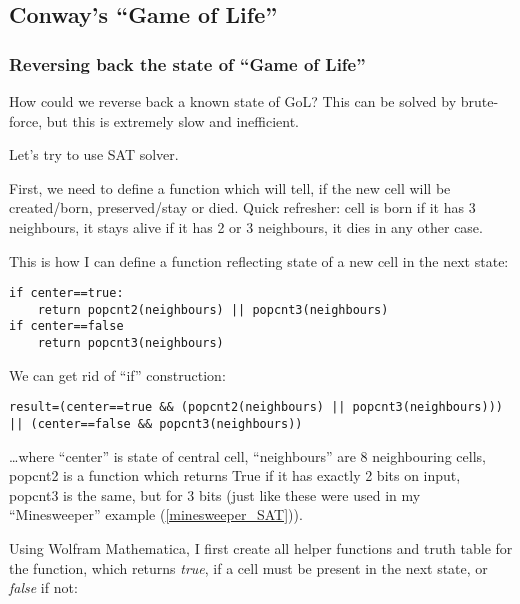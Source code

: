 \subsection{Conway's ``Game of Life''}

\renewcommand{\CURPATH}{CA/GoL}

\subsubsection{Reversing back the state of ``Game of Life''}

How could we reverse back a known state of GoL?
This can be solved by brute-force, but this is extremely slow and inefficient.

Let's try to use SAT solver.

First, we need to define a function which will tell, if the new cell will be created/born, preserved/stay or died.
Quick refresher: cell is born if it has 3 neighbours, it stays alive if it has 2 or 3 neighbours, it dies in any other case.

This is how I can define a function reflecting state of a new cell in the next state:

\begin{lstlisting}
if center==true:
	return popcnt2(neighbours) || popcnt3(neighbours)
if center==false
	return popcnt3(neighbours)
\end{lstlisting}

We can get rid of ``if'' construction:

\begin{lstlisting}
result=(center==true && (popcnt2(neighbours) || popcnt3(neighbours))) || (center==false && popcnt3(neighbours))
\end{lstlisting}

\dots where ``center'' is state of central cell, ``neighbours'' are 8 neighbouring cells, popcnt2 is a function which
returns True if it has exactly 2 bits on input, popcnt3 is the same, but for 3 bits
(just like these were used in my ``Minesweeper'' example (\ref{minesweeper_SAT})).

Using Wolfram Mathematica, I first create all helper functions and truth table for the function, which returns \textit{true},
if a cell must be present in the next state, or \textit{false} if not:

